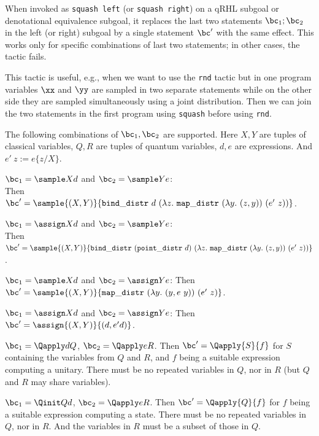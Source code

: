 \documentclass{article}
\begin{document}

When invoked as \texttt{squash left} (or \texttt{squash right}) on a
qRHL subgoal or denotational equivalence subgoal,
it replaces the last two statements $\bc_1;\bc_2$ in the
left (or right) subgoal by a single statement $\bc'$ with the same effect.
This works only for specific combinations of last two statements;
in other cases, the tactic fails.

This tactic is useful, e.g., when we want to use the \texttt{rnd}
tactic but in one program variables $\xx$ and $\yy$ are sampled in two
separate statements while on the other side they are sampled
simultaneously using a joint distribution. Then we can join the two
statements in the first program using \texttt{squash} before using
\texttt{rnd}.

The following combinations of $\bc_1,\bc_2$ are supported.
Here $X,Y$ are tuples of classical variables, $Q,R$ are tuples of quantum variables, $d,e$ are expressions.
And $e'\ z:=e\{z/X\}$.
\begin{compactitem}
\item $\bc_1=\sample X d$ and $\bc_2=\sample Y e$:\\
  Then $\bc'=\sample{(X,Y)}{\mathtt{bind\_distr}\ d\ (\lambda z.\ \mathtt{map\_distr}\ (\lambda y.\ (z,y))\ (e'\ z))}$.
\item $\bc_1=\assign X d$ and $\bc_2=\sample Y e$:\\
  Then $\bc'=\sample{(X,Y)}{\mathtt{bind\_distr}\ (\mathtt{point\_distr}\ d)\ (\lambda z.\ \mathtt{map\_distr}\ (\lambda y.\ (z,y))\ (e'\ z))}$.
\item $\bc_1=\sample X d$ and $\bc_2=\assign Y e$:
  Then $\bc'=\sample{(X,Y)}{\mathtt{map\_distr}\ (\lambda y.\ (y, e\ y))\ (e'\ z)}$.
\item $\bc_1=\assign X d$ and $\bc_2=\assign Y e$:
  Then $\bc'=\assign{(X,Y)}{(d, e' d)}$.
\item $\bc_1 = \Qapply d Q$, $\bc_2 = \Qapply e R$.
  Then $\bc' = \Qapply{S}{f}$ for $S$ containing the variables from $Q$ and $R$, and $f$ being a suitable expression computing a unitary.
  There must be no repeated variables in $Q$, nor in $R$ (but $Q$ and $R$ may share variables).
\item $\bc_1 = \Qinit Qd$, $\bc_2 = \Qapply e R$.
  Then $\bc' = \Qapply{Q}{f}$ for $f$ being a suitable expression computing a state.
  There must be no repeated variables in $Q$, nor in $R$. And the variables in $R$ must be a subset of those in $Q$.
\end{compactitem}
\end{document}
